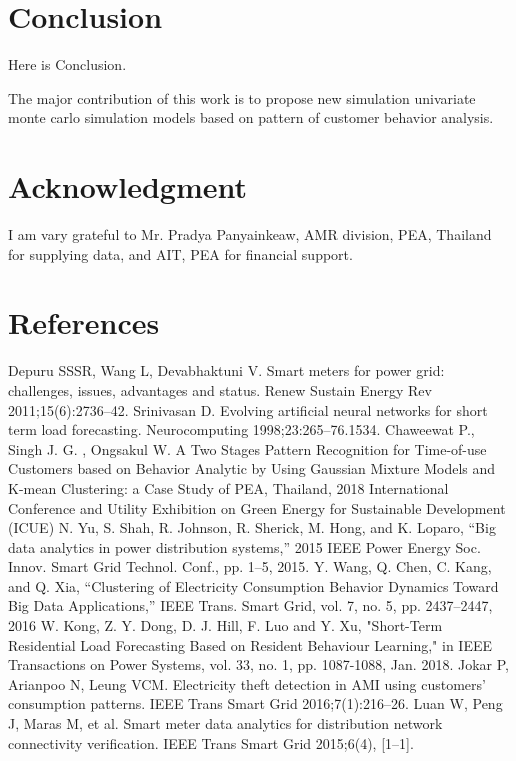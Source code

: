 \documentclass[conference]{IEEEtran}
\begin{document}
\section{Conclusion}
Here is Conclusion.

The major contribution of this work is to propose new simulation univariate monte carlo simulation models based on pattern of customer behavior analysis.


\section*{Acknowledgment}
I am vary grateful to Mr. Pradya Panyainkeaw, AMR division, PEA, Thailand for supplying data, and AIT, PEA for financial support.


\section*{References}

\begin{thebibliography}{00}
 Depuru SSSR, Wang L, Devabhaktuni V. Smart meters for power grid: challenges, issues, advantages and status. Renew Sustain Energy Rev 2011;15(6):2736–42.
 Srinivasan D. Evolving artificial neural networks for short term load forecasting. Neurocomputing 1998;23:265–76.1534.
 Chaweewat P., Singh J. G. , Ongsakul W. A Two Stages Pattern Recognition for Time-of-use Customers based on Behavior Analytic by Using Gaussian Mixture Models and K-mean Clustering: a Case Study of PEA, Thailand, 2018 International Conference and Utility Exhibition on Green Energy for Sustainable Development (ICUE)
 N. Yu, S. Shah, R. Johnson, R. Sherick, M. Hong, and K. Loparo, “Big data analytics in power distribution systems,” 2015 IEEE Power Energy Soc. Innov. Smart Grid Technol. Conf., pp. 1–5, 2015.
 Y. Wang, Q. Chen, C. Kang, and Q. Xia, “Clustering of Electricity Consumption Behavior Dynamics Toward Big Data Applications,” IEEE Trans. Smart Grid, vol. 7, no. 5, pp. 2437–2447, 2016
 W. Kong, Z. Y. Dong, D. J. Hill, F. Luo and Y. Xu, "Short-Term Residential Load Forecasting Based on Resident Behaviour Learning," in IEEE Transactions on Power Systems, vol. 33, no. 1, pp. 1087-1088, Jan. 2018.
 Jokar P, Arianpoo N, Leung VCM. Electricity theft detection in AMI using customers' consumption patterns. IEEE Trans Smart Grid 2016;7(1):216–26.
 Luan W, Peng J, Maras M, et al. Smart meter data analytics for distribution network connectivity verification. IEEE Trans Smart Grid 2015;6(4), [1–1].
\end{thebibliography}
\end{document}
